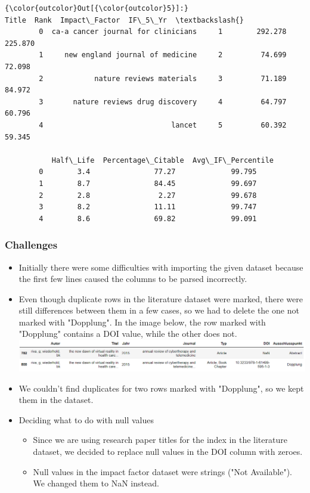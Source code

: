 \documentclass[11pt]{article}
\makeatletter
\def\maxwidth{\ifdim\Gin@nat@width>\linewidth\linewidth
    \else\Gin@nat@width\fi}
\let\Oldincludegraphics\includegraphics
\renewcommand{\includegraphics}[1]{\Oldincludegraphics[width=.8\maxwidth]{#1}}
\providecommand{\tightlist}{%
      \setlength{\itemsep}{0pt}\setlength{\parskip}{0pt}}
\makeatother
\begin{document}
\begin{Verbatim}[commandchars=\\\{\}]
{\color{outcolor}Out[{\color{outcolor}5}]:}                                 Title  Rank  Impact\_Factor  IF\_5\_Yr  \textbackslash{}
        0  ca-a cancer journal for clinicians     1        292.278  225.870   
        1     new england journal of medicine     2         74.699   72.098   
        2            nature reviews materials     3         71.189   84.972   
        3       nature reviews drug discovery     4         64.797   60.796   
        4                              lancet     5         60.392   59.345   
        
           Half\_Life  Percentage\_Citable  Avg\_IF\_Percentile  
        0        3.4               77.27             99.795  
        1        8.7               84.45             99.697  
        2        2.8                2.27             99.678  
        3        8.2               11.11             99.747  
        4        8.6               69.82             99.091  
\end{Verbatim}
            
    \subsubsection{Challenges}\label{challenges}

\begin{itemize}
\tightlist
\item
  Initially there were some difficulties with importing the given
  dataset because the first few lines caused the columns to be parsed
  incorrectly.
\item
  Even though duplicate rows in the literature dataset were marked,
  there were still differences between them in a few cases, so we had to
  delete the one not marked with "Dopplung". In the image below, the row
  marked with "Dopplung" contains a DOI value, while the other does not.
  \includegraphics{images/example_duplicate.png}
\item
  We couldn't find duplicates for two rows marked with "Dopplung", so we
  kept them in the dataset.
\item
  Deciding what to do with null values

  \begin{itemize}
  \tightlist
  \item
    Since we are using research paper titles for the index in the
    literature dataset, we decided to replace null values in the DOI
    column with zeroes.
  \item
    Null values in the impact factor dataset were strings ("Not
    Available"). We changed them to NaN instead.
  \end{itemize}
\end{itemize}
\end{document}
